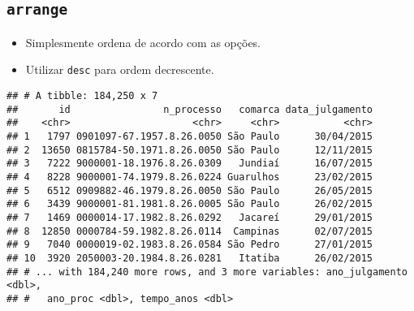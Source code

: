 \documentclass[]{book}
\newenvironment{Shaded}{\begin{snugshade}}{\end{snugshade}}
\newcommand{\KeywordTok}[1]{\textcolor[rgb]{0.13,0.29,0.53}{\textbf{{#1}}}}
\newcommand{\DataTypeTok}[1]{\textcolor[rgb]{0.13,0.29,0.53}{{#1}}}
\newcommand{\DecValTok}[1]{\textcolor[rgb]{0.00,0.00,0.81}{{#1}}}
\newcommand{\StringTok}[1]{\textcolor[rgb]{0.31,0.60,0.02}{{#1}}}
\newcommand{\NormalTok}[1]{{#1}}
\providecommand{\tightlist}{%
  \setlength{\itemsep}{0pt}\setlength{\parskip}{0pt}}
\begin{document}
\subsection{\texorpdfstring{\texttt{arrange}}{arrange}}\label{arrange}

\begin{itemize}
\tightlist
\item
  Simplesmente ordena de acordo com as opções.
\item
  Utilizar \texttt{desc} para ordem decrescente.
\end{itemize}

\begin{Shaded}
\end{Shaded}

\begin{verbatim}
## # A tibble: 184,250 x 7
##       id                n_processo   comarca data_julgamento
##    <chr>                     <chr>     <chr>           <chr>
## 1   1797 0901097-67.1957.8.26.0050 São Paulo      30/04/2015
## 2  13650 0815784-50.1971.8.26.0050 São Paulo      12/11/2015
## 3   7222 9000001-18.1976.8.26.0309   Jundiaí      16/07/2015
## 4   8228 9000001-74.1979.8.26.0224 Guarulhos      23/02/2015
## 5   6512 0909882-46.1979.8.26.0050 São Paulo      26/05/2015
## 6   3439 9000001-81.1981.8.26.0005 São Paulo      26/02/2015
## 7   1469 0000014-17.1982.8.26.0292   Jacareí      29/01/2015
## 8  12850 0000784-59.1982.8.26.0114  Campinas      02/07/2015
## 9   7040 0000019-02.1983.8.26.0584 São Pedro      27/01/2015
## 10  3920 2050003-20.1984.8.26.0281   Itatiba      26/02/2015
## # ... with 184,240 more rows, and 3 more variables: ano_julgamento <dbl>,
## #   ano_proc <dbl>, tempo_anos <dbl>
\end{verbatim}
\end{document}
